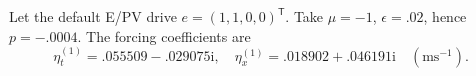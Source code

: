 \documentclass[11pt]{article}
\newcommand{\ii}{\mathrm{i}}
\DeclareMathOperator{\RePart}{Re}
\begin{document}
Let the default E/PV drive $e=(1,1,0,0)^{\mathsf T}$.
Take $\mu=-1$, $\epsilon=.02$, hence
$p=-.0004$. The  forcing coefficients are
\begin{equation}
 \eta_t^{(1)}=.055509-.029075\ii,\quad
 \eta_x^{(1)}=.018902+.046191\ii
 \quad(\mathrm{ms}^{-1}).
\end{equation}

\end{document}
